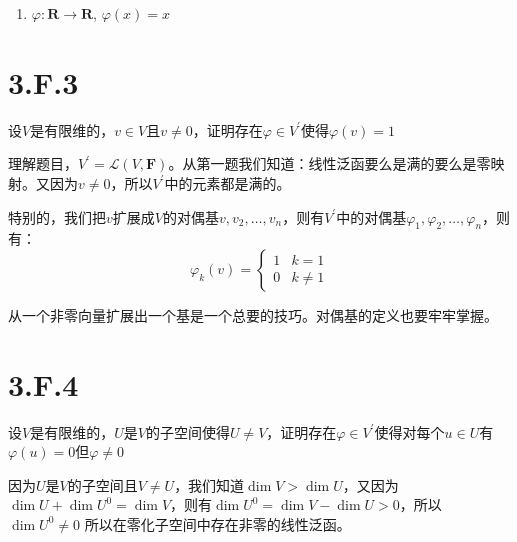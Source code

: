 \documentclass[10pt,a4paper,UTF8]{article}
\begin{document}
\begin{answer}
\begin{enumerate}
\item \(\varphi: \mathbf{R} \rightarrow \mathbf{R}\), \(\varphi(x) = x\)
\end{enumerate}
\end{answer}

\section{3.F.3}
\label{sec:org1f29713}


\begin{problem}
设\(V\)是有限维的，\(v\in V\)且\(v \neq 0\)，证明存在\(\varphi\in V^{'}\)使得\(\varphi(v) = 1\)
\end{problem}

\begin{answer}
理解题目，\(V^{'}= \mathcal{L}(V, \mathbf{F})\)。从第一题我们知道：线性泛函要么是满的要么是零映射。又因为\(v\neq 0\)，所以\(V^{'}\)中的元素都是满的。

特别的，我们把\(v\)扩展成\(V\)的对偶基\(v,v_{2},\ldots ,v_{n}\)，则有\(V^{'}\)中的对偶基\(\varphi_{1},\varphi_{2},\ldots ,\varphi_{n}\)，则有：
\begin{equation}
\label{eq:1}
\varphi_{k}(v) =
\begin{cases}
1 & k = 1  \\
0 & k\neq 1
\end{cases}
\end{equation}

从一个非零向量扩展出一个基是一个总要的技巧。对偶基的定义也要牢牢掌握。
\end{answer}

\section{3.F.4}
\label{sec:org96bfa99}


\begin{problem}
设\(V\)是有限维的，\(U\)是\(V\)的子空间使得\(U\neq V\)，证明存在\(\varphi\in V^{'}\)使得对每个\(u\in U\)有\(\varphi(u) = 0\)但\(\varphi \neq 0\)
\end{problem}

\begin{answer}
因为\(U\)是\(V\)的子空间且\(V\neq U\)，我们知道\(\dim V >  \dim U\)，又因为\(\dim U + \dim U^{0} = \dim V\)，则有\(\dim U^{0} = \dim V - \dim U > 0\)，所以\(\dim U^{0} \neq {0}\) 所以在零化子空间中存在非零的线性泛函。
\end{answer}
\end{document}
